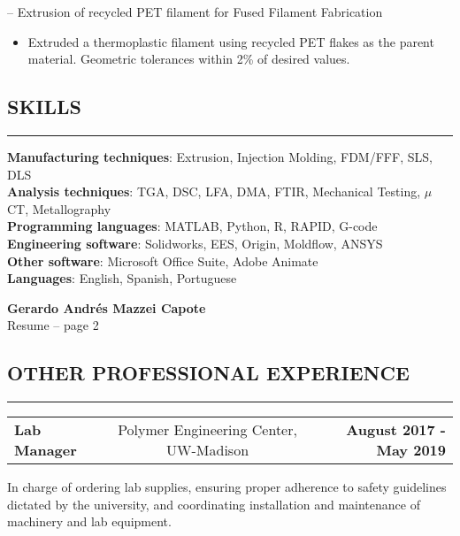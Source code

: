\documentclass[11pt,letterpaper]{article}
\makeatletter
\newcommand{\headerrow}[3]
{\vspace{0.4em}
\noindent
\begin{tabular*}{\textwidth}{l @{\extracolsep{\fill}} cr}
	\textbf{#1} & %
	#2 &		  %
	\textbf{#3}\\ %
\end{tabular*}}
\makeatother
\begin{document}
		\noindent -- Extrusion of recycled PET filament for Fused Filament Fabrication
		
		\begin{itemize}
			\item Extruded a thermoplastic filament using recycled PET flakes as the parent material. Geometric tolerances within 2\% of desired values.
		\end{itemize}

\subsection*{SKILLS}
\vspace{-0.5em}
\hrule
\vspace{0.4em}

\textbf{Manufacturing techniques}: Extrusion, Injection Molding, FDM/FFF, SLS, DLS\\
\textbf{Analysis techniques}: TGA, DSC, LFA, DMA, FTIR, Mechanical Testing, $\mu$CT, Metallography\\
\textbf{Programming languages}: MATLAB, Python, R, RAPID, G-code\\
\textbf{Engineering software}: Solidworks, EES, Origin, Moldflow, ANSYS\\
\textbf{Other software}: Microsoft Office Suite, Adobe Animate\\
\textbf{Languages}: English, Spanish, Portuguese\\

\pagebreak
\thispagestyle{empty} %

\begin{center}
	\LARGE \textbf{Gerardo Andrés Mazzei Capote} \\
	\normalsize Resume -- page 2
\end{center}

\subsection*{OTHER PROFESSIONAL EXPERIENCE}

\vspace{-0.5em}
\hrule

\headerrow
{Lab Manager}
{Polymer Engineering Center, UW-Madison} 
{August 2017 - May 2019}
In charge of ordering lab supplies, ensuring proper adherence to safety guidelines dictated by the university, and coordinating installation and maintenance of machinery and lab equipment.
\end{document}
